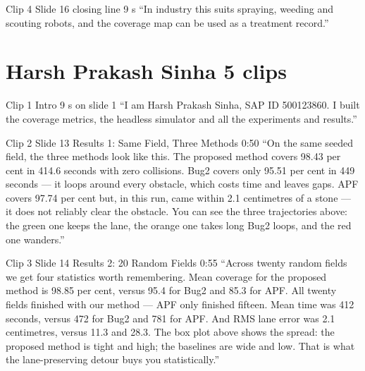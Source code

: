 \documentclass[11pt,a4paper]{article}
\begin{document}
\begin{clipbox}{Clip 4 \textbullet{} Slide 16 closing line \textbullet{} 9 s}
``In industry this suits spraying, weeding and scouting robots, and the coverage map can be used as a treatment record.''
\end{clipbox}

\section*{\color{brand}Harsh Prakash Sinha \textbullet{} 5 clips}

\begin{clipbox}{Clip 1 \textbullet{} Intro \textbullet{} 9 s \textbullet{} on slide 1}
``I am Harsh Prakash Sinha, SAP ID 500123860. I built the coverage metrics, the headless simulator and all the experiments and results.''
\end{clipbox}

\begin{clipbox}{Clip 2 \textbullet{} Slide 13 Results 1: Same Field, Three Methods \textbullet{} 0:50}
``On the same seeded field, the three methods look like this. The proposed method covers 98.43 per cent in 414.6 seconds with zero collisions. Bug2 covers only 95.51 per cent in 449 seconds --- it loops around every obstacle, which costs time and leaves gaps. APF covers 97.74 per cent but, in this run, came within 2.1 centimetres of a stone --- it does not reliably clear the obstacle. You can see the three trajectories above: the green one keeps the lane, the orange one takes long Bug2 loops, and the red one wanders.''
\end{clipbox}

\begin{clipbox}{Clip 3 \textbullet{} Slide 14 Results 2: 20 Random Fields \textbullet{} 0:55}
``Across twenty random fields we get four statistics worth remembering. Mean coverage for the proposed method is 98.85 per cent, versus 95.4 for Bug2 and 85.3 for APF. All twenty fields finished with our method --- APF only finished fifteen. Mean time was 412 seconds, versus 472 for Bug2 and 781 for APF. And RMS lane error was 2.1 centimetres, versus 11.3 and 28.3. The box plot above shows the spread: the proposed method is tight and high; the baselines are wide and low. That is what the lane-preserving detour buys you statistically.''
\end{clipbox}
\end{document}
